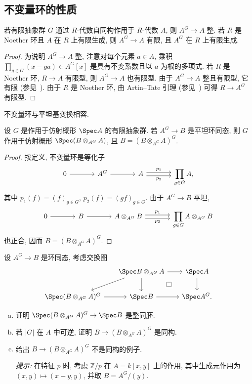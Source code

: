 \subsection{不变量环的性质}\label{src:5.2.2-subsection}
\begin{lemma}\label{src:5.2.6}
若有限抽象群 $G$ 通过 $R$-代数自同构作用于 $R$-代数 $A$, 则 $A^G\to A$ 整. 若 $R$ 是 Noether 环且 $A$ 在 $R$ 上有限生成, 则 $A^G\to A$ 有限, 且 $A^G$ 在 $R$ 上有限生成.
\end{lemma}
\begin{proof}
为说明 $A^G\to A$ 整, 注意对每个元素 $a\in A$, 乘积 $\prod_{g\in G}(x-ga)\in A^G[x]$ 是具有不变系数且以 $a$ 为根的多项式. 若 $R$ 是 Noether 环, $R\to A$ 有限型, 则 $A^G\to A$ 也有限型. 由于 $A^G\to A$ 整且有限型, 它有限 (参见~\cite[推论 $5.2$]{AM69}). 由于 $R$ 是 Noether 环, 由 Artin--Tate 引理 (参见~\cite[命题 $7.8$]{AM69}) 可得 $R\to A^G$ 有限型.
\end{proof}
不变量环与平坦基变换相容.
\begin{lemma}\label{src:5.2.7}
设 $G$ 是作用于仿射概形 $\Spec A$ 的有限抽象群. 若 $A^G\to B$ 是平坦环同态, 则 $G$ 作用于仿射概形 $\Spec(B\otimes_{A^G}A)$, 且 $B=(B\otimes_{A^G}A)^G$.
\end{lemma}
\begin{proof}
按定义, 不变量环是等化子
\[
\begin{tikzcd}[column sep=large]
0\arrow[r]&A^G\arrow[r]&A\arrow[r,shift left,"p_1"]\arrow[r,shift right,"p_2"']&\displaystyle\prod_{g\in G}A,
\end{tikzcd}
\]
其中 $p_1(f)=(f)_{g\in G}$, $p_2(f)=(gf)_{g\in G}$. 由于 $A^G\to B$ 平坦,
\[
\begin{tikzcd}[column sep=large]
0\arrow[r]&B\arrow[r]&A\otimes_{A^G}B\arrow[r,shift left,"p_1"]\arrow[r,shift right,"p_2"']&\displaystyle\prod_{g\in G}A\otimes_{A^G}B
\end{tikzcd}
\]
也正合, 因而 $B=(B\otimes_{A^G}A)^G$.
\end{proof}
\newpage
\begin{exercise}\label{src:5.2.8}
设 $A^G\to B$ 是环同态, 考虑交换图
\[
\begin{tikzcd}[column sep=1.7em]
&\Spec B\otimes_{A^G}A\arrow[r]\arrow[d]\arrow[dl]&\Spec A\arrow[d]\\
\Spec(B\otimes_{A^G}A)^G\arrow[r]&\Spec B\arrow[r]\arrow[ur,phantom,"\square" description]&\Spec A^G.
\end{tikzcd}
\]
\begin{enumerate}[(a)]
\item 证明 $\Spec(B\otimes_{A^G}A)^G\to\Spec B$ 是整同胚.
\item 若 $|G|$ 在 $A$ 中可逆, 证明 $B\to(B\otimes_{A^G}A)^G$ 是同构.
\item 给出 $B\to(B\otimes_{A^G}A)^G$ 不是同构的例子.

\textit{提示:} 在特征 $p$ 时, 考虑 $\mathbb Z/p$ 在 $A=k[x,y]$ 上的作用, 其中生成元作用为 $(x,y)\mapsto(x+y,y)$, 并取 $B=A^G/(y)$.
\end{enumerate}
\end{exercise}

